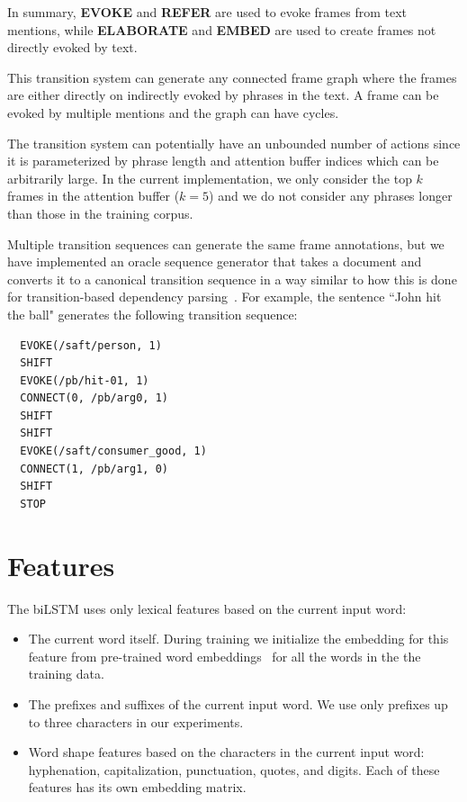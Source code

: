 \documentclass[11pt,a4paper]{article}
\begin{document}
In summary, {\bf EVOKE} and {\bf REFER} are used to evoke frames from text
mentions, while {\bf ELABORATE} and {\bf EMBED} are used to create frames not
directly evoked by text.

This transition system can generate any connected frame graph where the frames
are either directly on indirectly evoked by phrases in the text. A frame
can be evoked by multiple mentions and the graph can have cycles.

The transition system can potentially have an unbounded number of actions since
it is parameterized by phrase length and attention buffer indices which can be
arbitrarily large. In the current implementation, we only consider the
top $k$ frames in the attention buffer ($k=5$) and we do not consider any phrases
longer than those in the training corpus.

Multiple transition sequences can generate the same frame annotations, but we
have implemented an oracle sequence generator that takes a document and converts
it to a canonical transition sequence in a way similar to how this is done
for transition-based dependency parsing~\cite{nivre2006}. For example, the sentence
``John hit the ball" generates the following transition sequence:
\begin{verbatim}
  EVOKE(/saft/person, 1)
  SHIFT
  EVOKE(/pb/hit-01, 1)
  CONNECT(0, /pb/arg0, 1)
  SHIFT
  SHIFT
  EVOKE(/saft/consumer_good, 1)
  CONNECT(1, /pb/arg1, 0)
  SHIFT
  STOP
\end{verbatim}

\section{Features}
\label{sec:features}

The biLSTM uses only lexical features based on the current input word:

\begin{itemize}
  \item The current word itself. During training we initialize the embedding
  for this feature from pre-trained word embeddings~\cite{mikolov2013} for all
  the words in the the training data.
  \item The prefixes and suffixes of the current input word. We use only
  prefixes up to three characters in our experiments.
  \item Word shape features based on the characters in the current input word:
  hyphenation, capitalization, punctuation, quotes, and digits. Each of these
  features has its own embedding matrix.
\end{itemize}
\end{document}
